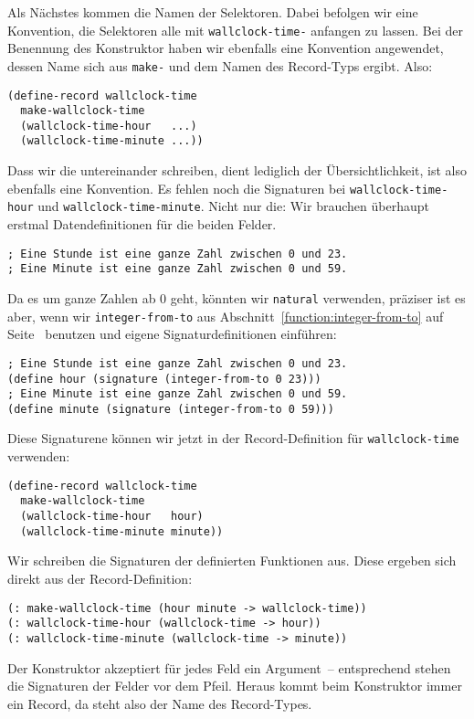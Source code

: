 \mantraschreib*

\noindent Als Nächstes kommen die Namen der Selektoren.  Dabei befolgen wir eine
Konvention, die Selektoren alle mit \lstinline{wallclock-time-} anfangen
zu lassen.  Bei der Benennung des Konstruktor haben wir ebenfalls
eine Konvention angewendet, dessen Name sich aus \lstinline{make-} und
dem Namen des Record-Typs ergibt.  Also:
%
\begin{lstlisting}
(define-record wallclock-time
  make-wallclock-time
  (wallclock-time-hour   ...)
  (wallclock-time-minute ...))
\end{lstlisting}
%
Dass wir die untereinander schreiben, dient lediglich der
Übersichtlichkeit, ist also ebenfalls eine Konvention.  Es fehlen noch
die Signaturen bei \lstinline{wallclock-time-hour} und
\lstinline{wallclock-time-minute}.  Nicht nur die: Wir brauchen
überhaupt erstmal Datendefinitionen für die beiden Felder.
%
\begin{lstlisting}
; Eine Stunde ist eine ganze Zahl zwischen 0 und 23.
; Eine Minute ist eine ganze Zahl zwischen 0 und 59.
\end{lstlisting}
%
Da es um ganze Zahlen ab 0 geht, könnten wir \lstinline{natural}
verwenden, präziser ist es aber, wenn wir \lstinline{integer-from-to}
aus Abschnitt~\ref{function:integer-from-to} auf
Seite~\pageref{function:integer-from-to} benutzen und eigene
Signaturdefinitionen einführen:
%
\begin{lstlisting}
; Eine Stunde ist eine ganze Zahl zwischen 0 und 23.
(define hour (signature (integer-from-to 0 23)))
; Eine Minute ist eine ganze Zahl zwischen 0 und 59.
(define minute (signature (integer-from-to 0 59)))
\end{lstlisting}
%
Diese Signaturene können wir jetzt in der Record-Definition für
\lstinline{wallclock-time} verwenden:
%
\begin{lstlisting}
(define-record wallclock-time
  make-wallclock-time
  (wallclock-time-hour   hour)
  (wallclock-time-minute minute))
\end{lstlisting}
%
Wir schreiben die Signaturen der definierten Funktionen aus.  Diese
ergeben sich direkt aus der Record-Definition:
%
\begin{lstlisting}
(: make-wallclock-time (hour minute -> wallclock-time))
(: wallclock-time-hour (wallclock-time -> hour))
(: wallclock-time-minute (wallclock-time -> minute))
\end{lstlisting}
%
Der Konstruktor akzeptiert für jedes Feld ein Argument~-- entsprechend
stehen die Signaturen der Felder vor dem Pfeil.  Heraus kommt beim
Konstruktor immer ein Record, da steht also der Name des Record-Types.

